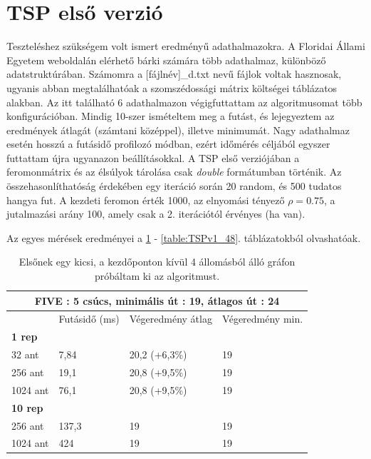 \section{TSP első verzió}

Teszteléshez szükségem volt ismert eredményű adathalmazokra. A Floridai Állami Egyetem weboldalán \cite{TSPdataset} elérhető bárki számára több adathalmaz, különböző adatstruktúrában. Számomra a [fájlnév]\_d.txt nevű fájlok voltak hasznosak, ugyanis abban megtalálhatóak a szomszédossági mátrix költségei táblázatos alakban. Az itt található 6 adathalmazon végigfuttattam az algoritmusomat több konfigurációban. Mindig 10-szer ismételtem meg a futást, és lejegyeztem az eredmények átlagát (számtani középpel), illetve minimumát. Nagy adathalmaz esetén hosszú a futásidő profilozó módban, ezért időmérés céljából egyszer futtattam újra ugyanazon beállításokkal. A TSP első verziójában a feromonmátrix és az élsúlyok tárolása csak \textit{double} formátumban történik. Az összehasonlíthatóság érdekében egy iteráció során 20 random, és 500 tudatos hangya fut. A kezdeti feromon érték 1000, az elnyomási tényező \( \rho = 0.75 \), a jutalmazási arány 100, amely csak a 2. iterációtól érvényes (ha van). 

Az egyes mérések eredményei a \ref{table:TSPv1_5} - \ref{table:TSPv1_48}. táblázatokból olvashatóak.

\begin{table}[ht!]
	\centering
	\begin{tabular}{|p{2cm}||p{3cm}|p{3.5cm}|p{3.5cm}|}
		\hline
		\multicolumn{4}{|c|}{FIVE : 5 csúcs, minimális út : 19, átlagos út : 24} \\
		\hline
		& Futásidő (ms) & Végeredmény átlag & Végeredmény min.\\
		\hline
		\textbf{1 rep} & & &\\
		32 ant& 7,84 & 20,2 (+6,3\%) & 19\\
		256 ant & 19,1 & 20,8 (+9,5\%) & 19\\
		1024 ant & 76,1 & 20,8 (+9,5\%) &	19\\
		\hline
		\textbf{10 rep} & & &\\
		256 ant & 137,3 & 19 &	19\\
		1024 ant & 424 &	19 &	19\\
		\hline
	\end{tabular}
	\caption{Elsőnek egy kicsi, a kezdőponton kívül 4 állomásból álló gráfon próbáltam ki az algoritmust.}
	\label{table:TSPv1_5}
\end{table}

